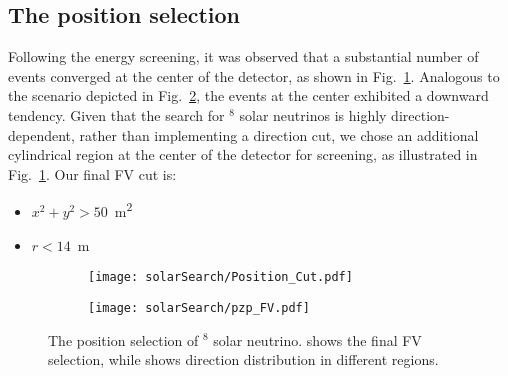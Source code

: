 \subsection{The position selection}
Following the energy screening, it was observed that a substantial number of events converged at the center of the detector, as shown in Fig.~\ref{fig:solar_pos_cut}. Analogous to the scenario depicted in Fig.~\ref{fig:solar_direction}, the events at the center exhibited a downward tendency. Given that the search for $^8$ solar neutrinos is highly direction-dependent, rather than implementing a direction cut, we chose an additional cylindrical region at the center of the detector for screening, as illustrated in Fig.~\ref{fig:solar_pos_cut}. Our final FV cut is:
\begin{itemize}
	\item $x^2+y^2>50$~\si{m^2}
	\item $r<14$~\si{m}
\end{itemize}

\begin{figure}[htbp]
	\centering
	\begin{subfigure}{0.5\textwidth}
		\centering
		\texttt{[image: solarSearch/Position\_Cut.pdf]}
		\caption{}
		\label{fig:solar_pos_cut}
	\end{subfigure}%
	\begin{subfigure}{0.5\textwidth}
		\centering
		\texttt{[image: solarSearch/pzp\_FV.pdf]}
		\caption{}
		\label{fig:solar_direction}
	\end{subfigure}
	\caption{The position selection of $^8$ solar neutrino.  shows the final FV selection, while  shows direction distribution in different regions.}
	\label{fig:solar_position_cut}
\end{figure}

